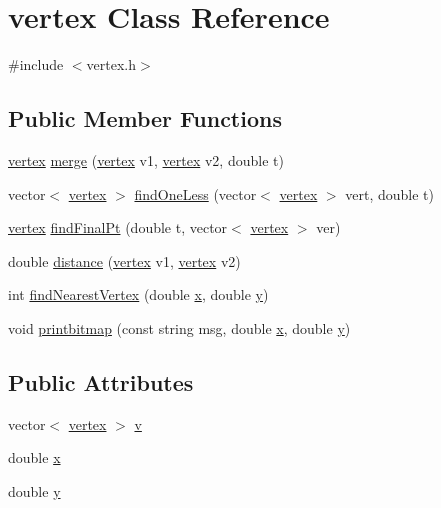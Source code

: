 \hypertarget{classvertex}{}\section{vertex Class Reference}
\label{classvertex}


{\ttfamily \#include $<$vertex.\+h$>$}

\subsection*{Public Member Functions}
\begin{DoxyCompactItemize}
\item 
\hyperlink{classvertex}{vertex} \hyperlink{classvertex_aefda2986f4a966108034c7c6db0fd280}{merge} (\hyperlink{classvertex}{vertex} v1, \hyperlink{classvertex}{vertex} v2, double t)
\item 
vector$<$ \hyperlink{classvertex}{vertex} $>$ \hyperlink{classvertex_a202d5209c7340d7669c15e1933e677a0}{find\+One\+Less} (vector$<$ \hyperlink{classvertex}{vertex} $>$ vert, double t)
\item 
\hyperlink{classvertex}{vertex} \hyperlink{classvertex_a458b661ebfaf61213b56808fa0b3547f}{find\+Final\+Pt} (double t, vector$<$ \hyperlink{classvertex}{vertex} $>$ ver)
\item 
double \hyperlink{classvertex_a805e0de0af85470e4fbf698d71e6c122}{distance} (\hyperlink{classvertex}{vertex} v1, \hyperlink{classvertex}{vertex} v2)
\item 
int \hyperlink{classvertex_a2e1c5ac0589fae95a9e62f6685037fe6}{find\+Nearest\+Vertex} (double \hyperlink{classvertex_a11f52ec2e920d56500baefe5a2e2bba7}{x}, double \hyperlink{classvertex_a8b9f211498390a67c369fd43f3722a19}{y})
\item 
void \hyperlink{classvertex_ad4edf1c3b1666180030157724c855d58}{printbitmap} (const string msg, double \hyperlink{classvertex_a11f52ec2e920d56500baefe5a2e2bba7}{x}, double \hyperlink{classvertex_a8b9f211498390a67c369fd43f3722a19}{y})
\end{DoxyCompactItemize}
\subsection*{Public Attributes}
\begin{DoxyCompactItemize}
\item 
vector$<$ \hyperlink{classvertex}{vertex} $>$ \hyperlink{classvertex_a3d22584dccb715b7f0d25b73825330ad}{v}
\item 
double \hyperlink{classvertex_a11f52ec2e920d56500baefe5a2e2bba7}{x}
\item 
double \hyperlink{classvertex_a8b9f211498390a67c369fd43f3722a19}{y}
\end{DoxyCompactItemize}


